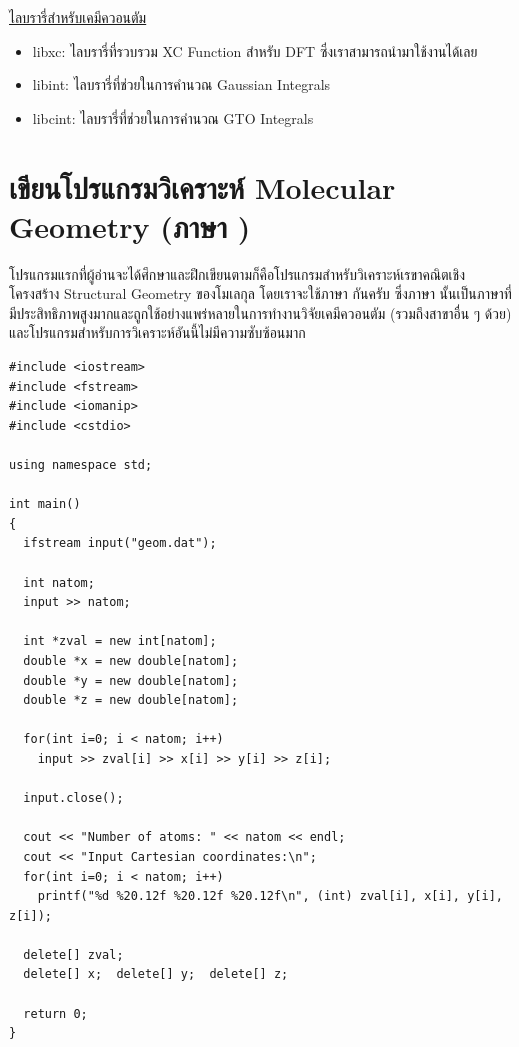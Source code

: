 \noindent \underline{ไลบรารี่สำหรับเคมีควอนตัม}
%
\begin{itemize}[topsep=0pt,noitemsep]
  \item libxc: ไลบรารี่ที่รวบรวม XC Function สำหรับ DFT ซึ่งเราสามารถนำมาใช้งานได้เลย

  \item libint: ไลบรารี่ที่ช่วยในการคำนวณ Gaussian Integrals

  \item libcint: ไลบรารี่ที่ช่วยในการคำนวณ GTO Integrals
\end{itemize}

\section{เขียนโปรแกรมวิเคราะห์ Molecular Geometry (ภาษา \cpp)}

โปรแกรมแรกที่ผู้อ่านจะได้ศึกษาและฝึกเขียนตามก็คือโปรแกรมสำหรับวิเคราะห์เรขาคณิตเชิงโครงสร้าง Structural Geometry ของโมเลกุล โดยเราจะใช้ภาษา \cpp กันครับ ซึ่งภาษา \cpp นั้นเป็นภาษาที่มีประสิทธิภาพสูงมากและถูกใช้อย่างแพร่หลายในการทำงานวิจัยเคมีควอนตัม (รวมถึงสาขาอื่น ๆ ด้วย) และโปรแกรมสำหรับการวิเคราะห์อันนี้ไม่มีความซับซ้อนมาก

\noindent {}

\vspace{5pt}

\begin{lstlisting}[style=MyC++]
#include <iostream>
#include <fstream>
#include <iomanip>
#include <cstdio>

using namespace std;

int main() 
{
  ifstream input("geom.dat");

  int natom;
  input >> natom;

  int *zval = new int[natom];
  double *x = new double[natom];
  double *y = new double[natom];
  double *z = new double[natom];

  for(int i=0; i < natom; i++)
    input >> zval[i] >> x[i] >> y[i] >> z[i];
  
  input.close();

  cout << "Number of atoms: " << natom << endl;
  cout << "Input Cartesian coordinates:\n";
  for(int i=0; i < natom; i++)
    printf("%d %20.12f %20.12f %20.12f\n", (int) zval[i], x[i], y[i], z[i]);

  delete[] zval;
  delete[] x;  delete[] y;  delete[] z;

  return 0;
}
\end{lstlisting}

